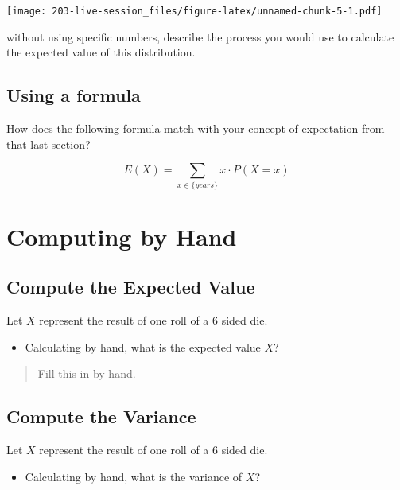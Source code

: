 \documentclass[
]{book}
\providecommand{\tightlist}{%
  \setlength{\itemsep}{0pt}\setlength{\parskip}{0pt}}
\theoremstyle{definition}
\theoremstyle{definition}
\theoremstyle{definition}
\theoremstyle{definition}
\theoremstyle{remark}
\begin{document}
\texttt{[image: 203-live-session\_files/figure-latex/unnamed-chunk-5-1.pdf]}

without using specific numbers, describe the process you would use to calculate the expected value of this distribution.

\hypertarget{using-a-formula}{%
\subsection{Using a formula}\label{using-a-formula}}

How does the following formula match with your concept of expectation from that last section?

\[
  E(X) = \sum_{x \in \{years\}} x \cdot P(X=x)
\]

\hypertarget{computing-by-hand}{%
\section{Computing by Hand}\label{computing-by-hand}}

\hypertarget{compute-the-expected-value}{%
\subsection{Compute the Expected Value}\label{compute-the-expected-value}}

Let \(X\) represent the result of one roll of a 6 sided die.

\begin{itemize}
\tightlist
\item
  Calculating by hand, what is the expected value \(X\)?
\end{itemize}

\begin{quote}
Fill this in by hand.
\end{quote}

\hypertarget{compute-the-variance}{%
\subsection{Compute the Variance}\label{compute-the-variance}}

Let \(X\) represent the result of one roll of a 6 sided die.

\begin{itemize}
\tightlist
\item
  Calculating by hand, what is the variance of \(X\)?
\end{itemize}
\end{document}
